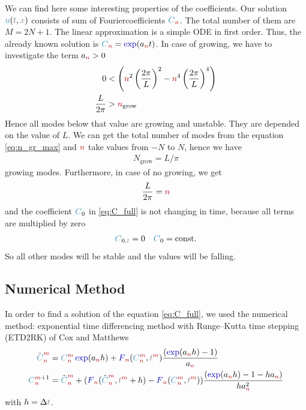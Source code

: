 \documentclass[10pt,fleqn, %
reqno,a4paper]{article}
\makeatletter
\def\mathcolor#1#{\@mathcolor{#1}}
\def\@mathcolor#1#2#3{%
        \protect\leavevmode
        \begingroup\color#1{#2}#3\endgroup
}
\newcommand{\nx}{\mathcolor{gray}{x}}
\newcommand{\nt}{\mathcolor{gray}{t}}
\newcommand{\nnu}{\mathcolor{cyan!70!black}{u}}
\newcommand{\nexp}{\mathcolor{blue!70!black}{\exp}}
\newcommand{\nm}{\mathcolor{red!70!black}{m}}
\newcommand{\nn}{\mathcolor{red!70!black}{n}}
\newcommand{\nF}{\mathcolor{blue!70!black}{F}}
\newcommand{\nC}{\mathcolor{cyan!70!black}{C}}
\makeatother
\begin{document}
We can find here some interesting properties of the coefficients.
Our solution $ \nnu (\nt, \nx) $ consists of sum of Fouriercoefficients $ \nC_{\nn} $. 
The total number of them are $ M = 2N+1 $. 
The linear approximation is a simple ODE in first order. 
Thus, the already known solution is $ \nC_{\nn} = \nexp(a_{\nn}t) $.
In case of growing, we have to investigate the term $ a_{\nn} > 0 $
\begin{align}
        0 & < \left( \nn^2\left(\frac{2\pi}{L}\right)^2 -\nn^4\left(\frac{2\pi}{L}\right)^4\right) \nonumber \\
        \frac{L}{2\pi} &> \nn _{\mathrm{grow}} \label{eq:n_gr_max}
\end{align}
Hence all modes below that value are growing and unstable.
They are depended on the value of $ L $. 
We can get the total number of modes from the equation \ref{eq:n_gr_max} and $ \nn $ take values from $ -N $ to $ N $, hence we have 
\begin{align}
        N_{\mathrm{grow}} = L/\pi \label{eq:n_grow}
\end{align}
growing modes.
Furthermore, in case of no growing, we get
\begin{align*}
\frac{L}{2\pi} = \nn
\end{align*}
and the coefficient $ \nC_{0} $ in \eqref{eq:C_full} is not changing in time, because all terms are multiplied by zero
\begin{align*}
        \nC_{0, \nt} = 0 \quad \nC_{0} = \mathrm{const.}
\end{align*}
So all other modes will be stable and the values will be falling.

\subsection{Numerical Method}
In order to find a solution of the equation \eqref{eq:C_full}, we used the numerical method: exponential time differencing method with Runge–Kutta time stepping (ETD2RK) of Cox and Matthews \cite{friedman_numerical_nodate}
\begin{align}
        \tilde{\nC}_{\nn}^{\nm} & = \nC_{\nn}^{\nm}\nexp(a_{\nn} h) + \nF_{\nn}(\nC_{\nn}^{\nm}, \nt^{\nm}) \frac{(\nexp(a_{\nn}h)-1)}{a_{\nn}} \nonumber \\
        \nC_{\nn}^{\nm+1} & = \tilde{\nC}_{\nn}^{\nm} + (\nF_{\nn}(\tilde{\nC}_{\nn}^{\nm}, \nt^{\nm} + h) - \nF_{\nn}(\nC_{\nn}^{\nm}, \nt^{\nm}))\frac{(\nexp(a_{\nn}h) - 1 - h a_{\nn})}{h a_{\nn}^2} \label{eq:ETD2RK}
\end{align}
with $ h = \Delta \nt $.
\end{document}
